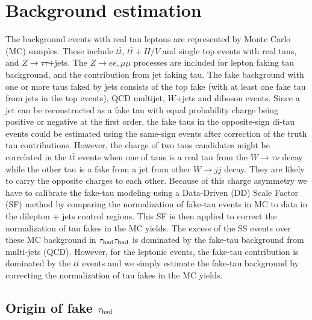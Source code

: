 \section{Background estimation}
\label{sec:background}

The background events with real tau leptons are represented by Monte Carlo (MC) samples. These include $t\bar{t}$, $t\bar{t}+H/V$ and 
single top events with real taus, and $Z\to\tau\tau$+jets. The $Z\to ee,\mu\mu$ processes are included for lepton faking 
tau background, and the contribution from jet faking tau.
The fake background with one or more taus faked by jets consists of the top fake (with at least one fake tau from jets in the top events), 
QCD multijet, $W$+jets and diboson events. Since a jet can be reconstructed as a fake tau with equal probability charge being positive or 
negative at the first order, the fake taus in the opposite-sign di-tau events could be estimated using the same-sign events 
after correction of the truth tau contributions. 
However, the charge of two taus candidates might be correlated in the $t\bar t$ events
when one of taus is a real tau from the $W\rightarrow \tau \nu$ decay while the other tau is a fake from a jet from other $W\rightarrow jj$ decay.
They are likely to carry the opposite charges to each other.  
Because of this charge asymmetry we have to calibrate the fake-tau modeling using a Data-Driven (DD) Scale Factor (SF) 
method by comparing the normalization of fake-tau events in MC to data in the dilepton + jets control regions.
This SF is then applied to correct the normalization of tau fakes in the MC yields.
The excess of the SS events over these MC background in $\tau_\text{had}{}\tau_\text{had}$ is dominated by the fake-tau background from multi-jets (QCD).
However, for the leptonic events, the fake-tau contribution is dominated by the $t\bar t$ events and 
we simply estimate the fake-tau background by correcting the normalization of tau fakes in the MC yields. 

\subsection{Origin of fake $\tau_\text{had}$}
\label{sec:fake_origin}

